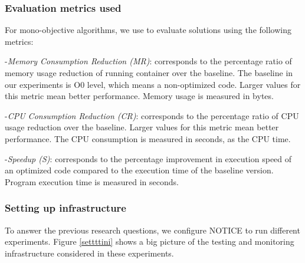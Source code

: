 \subsubsection{Evaluation metrics used}

For mono-objective algorithms, we use to evaluate solutions using the following metrics:

-\textit{Memory Consumption Reduction (MR)}: corresponds to the percentage ratio of memory usage reduction of running container over the baseline. The baseline in our experiments is O0 level, which means a non-optimized code. Larger values for this metric mean better performance. Memory usage is measured in bytes.

-\textit{CPU Consumption Reduction (CR)}: corresponds to the percentage ratio of CPU usage reduction over the baseline. Larger values for this metric mean better performance. The CPU consumption is measured in seconds, as the CPU time.

-\textit{Speedup (S)}: corresponds to the percentage improvement in execution speed of an optimized code compared to the execution time of the baseline version. Program execution time is measured in seconds.




\subsubsection{Setting up infrastructure}
To answer the previous research questions, we configure NOTICE to run different experiments. Figure \ref{settttini} shows a big picture of the testing and monitoring infrastructure considered in these experiments. 

